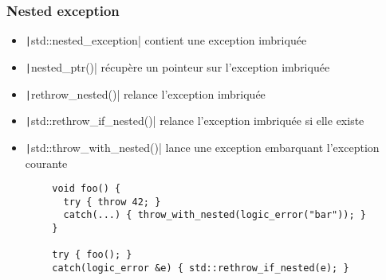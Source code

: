 \documentclass[C++.tex]{subfiles}
\begin{document}
\begin{frame}[fragile]
	\frametitle{Nested exception}
	\begin{itemize}
		\item \texttt|std::nested_exception| contient une exception imbriquée
		\item \texttt|nested_ptr()| récupère un pointeur sur l'exception imbriquée
		\item \texttt|rethrow_nested()| relance l'exception imbriquée
		\item \texttt|std::rethrow_if_nested()| relance l'exception imbriquée si elle existe
		\item \texttt|std::throw_with_nested()| lance une exception embarquant l'exception courante
	\end{itemize}

	\begin{verbatim}
		void foo() {
		  try { throw 42; }
		  catch(...) { throw_with_nested(logic_error("bar")); }
		}

		try { foo(); }
		catch(logic_error &e) { std::rethrow_if_nested(e); }
	\end{verbatim}

\end{frame}
\end{document}
